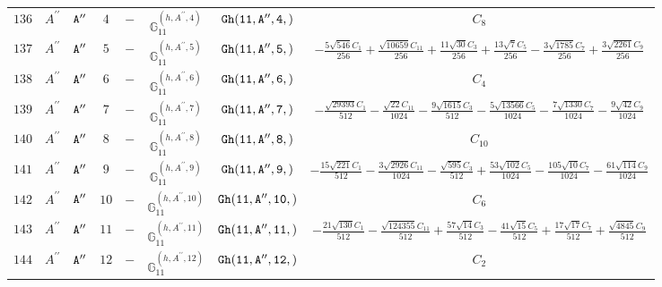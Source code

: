 \documentclass[fleqn,8pt]{jsarticle}
\begin{document}
\begin{table}[ht!]
\begin{center}
\begin{tabular}{cccccccc}
$ 136 $ & $ A^{\prime\prime} $ & $ {\tt A''} $ & $ 4 $ & $ - $ & $ \mathbb{G}_{11}^{(h,A^{\prime\prime},4)} $ & $ {\tt Gh(11,A'',4,)} $ & $ C_{8} $ \\
$ 137 $ & $ A^{\prime\prime} $ & $ {\tt A''} $ & $ 5 $ & $ - $ & $ \mathbb{G}_{11}^{(h,A^{\prime\prime},5)} $ & $ {\tt Gh(11,A'',5,)} $ & $ - \frac{5 \sqrt{546} C_{1}}{256} + \frac{\sqrt{10659} C_{11}}{256} + \frac{11 \sqrt{30} C_{3}}{256} + \frac{13 \sqrt{7} C_{5}}{256} - \frac{3 \sqrt{1785} C_{7}}{256} + \frac{3 \sqrt{2261} C_{9}}{256} $ \\
$ 138 $ & $ A^{\prime\prime} $ & $ {\tt A''} $ & $ 6 $ & $ - $ & $ \mathbb{G}_{11}^{(h,A^{\prime\prime},6)} $ & $ {\tt Gh(11,A'',6,)} $ & $ C_{4} $ \\
$ 139 $ & $ A^{\prime\prime} $ & $ {\tt A''} $ & $ 7 $ & $ - $ & $ \mathbb{G}_{11}^{(h,A^{\prime\prime},7)} $ & $ {\tt Gh(11,A'',7,)} $ & $ - \frac{\sqrt{29393} C_{1}}{512} - \frac{\sqrt{22} C_{11}}{1024} - \frac{9 \sqrt{1615} C_{3}}{512} - \frac{5 \sqrt{13566} C_{5}}{1024} - \frac{7 \sqrt{1330} C_{7}}{1024} - \frac{9 \sqrt{42} C_{9}}{1024} $ \\
$ 140 $ & $ A^{\prime\prime} $ & $ {\tt A''} $ & $ 8 $ & $ - $ & $ \mathbb{G}_{11}^{(h,A^{\prime\prime},8)} $ & $ {\tt Gh(11,A'',8,)} $ & $ C_{10} $ \\
$ 141 $ & $ A^{\prime\prime} $ & $ {\tt A''} $ & $ 9 $ & $ - $ & $ \mathbb{G}_{11}^{(h,A^{\prime\prime},9)} $ & $ {\tt Gh(11,A'',9,)} $ & $ - \frac{15 \sqrt{221} C_{1}}{512} - \frac{3 \sqrt{2926} C_{11}}{1024} - \frac{\sqrt{595} C_{3}}{512} + \frac{53 \sqrt{102} C_{5}}{1024} - \frac{105 \sqrt{10} C_{7}}{1024} - \frac{61 \sqrt{114} C_{9}}{1024} $ \\
$ 142 $ & $ A^{\prime\prime} $ & $ {\tt A''} $ & $ 10 $ & $ - $ & $ \mathbb{G}_{11}^{(h,A^{\prime\prime},10)} $ & $ {\tt Gh(11,A'',10,)} $ & $ C_{6} $ \\
$ 143 $ & $ A^{\prime\prime} $ & $ {\tt A''} $ & $ 11 $ & $ - $ & $ \mathbb{G}_{11}^{(h,A^{\prime\prime},11)} $ & $ {\tt Gh(11,A'',11,)} $ & $ - \frac{21 \sqrt{130} C_{1}}{512} - \frac{\sqrt{124355} C_{11}}{512} + \frac{57 \sqrt{14} C_{3}}{512} - \frac{41 \sqrt{15} C_{5}}{512} + \frac{17 \sqrt{17} C_{7}}{512} + \frac{\sqrt{4845} C_{9}}{512} $ \\
$ 144 $ & $ A^{\prime\prime} $ & $ {\tt A''} $ & $ 12 $ & $ - $ & $ \mathbb{G}_{11}^{(h,A^{\prime\prime},12)} $ & $ {\tt Gh(11,A'',12,)} $ & $ C_{2} $ \\
 \hline \hline
\end{tabular}
\end{center}
\end{table}
\end{document}
